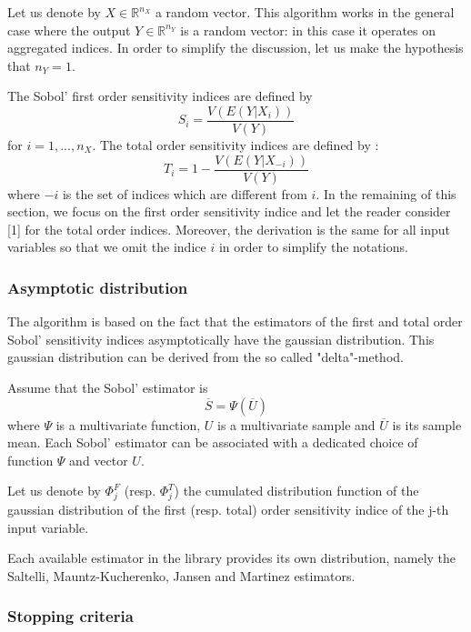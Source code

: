 \documentclass{article}
\begin{document}
Let us denote by $X\in\mathbb{R}^{n_X}$ a random vector. 
This algorithm works in the general case where the output $Y\in\mathbb{R}^{n_Y}$ is a random 
vector: in this case it operates on aggregated indices. 
In order to simplify the discussion, let us make the hypothesis that $n_Y=1$. 

The Sobol' first order sensitivity indices are defined by 
$$
S_i = \frac{V(E(Y|X_i))}{V(Y)}
$$
for $i=1,...,n_X$. The total order sensitivity indices are defined by :
$$
T_i = 1 - \frac{V\left(E\left(Y|X_{-i}\right)\right)}{V(Y)}
$$
where $-i$ is the set of indices which are different from $i$. 
In the remaining of this section, 
we focus on the first order sensitivity indice and let the reader consider [1] for the total 
order indices. 
Moreover, the derivation is the same for all input variables so that we omit the 
indice $i$ in order to simplify the notations. 


\subsubsection{Asymptotic distribution}

The algorithm is based on the fact that the estimators of the 
first and total order Sobol' sensitivity indices 
asymptotically have the gaussian distribution. 
This gaussian distribution can be derived from the 
so called "delta"-method. 

Assume that the Sobol' estimator is 
$$
\overline{S} = \Psi\left(\overline{U}\right)
$$
where $\Psi$ is a multivariate function, $U$ is a multivariate sample and $\overline{U}$ is its 
sample mean. 
Each Sobol' estimator can be associated with a dedicated choice of function $\Psi$ 
and vector $U$. 

Let us denote by $\Phi_j^F$ (resp. $\Phi_j^T$) the cumulated distribution function of the 
gaussian distribution of the first (resp. total) order sensitivity indice of the j-th input 
variable.

Each available estimator in the library provides its own distribution, namely 
the Saltelli, Mauntz-Kucherenko, Jansen and Martinez estimators.

\subsubsection{Stopping criteria}
\end{document}
